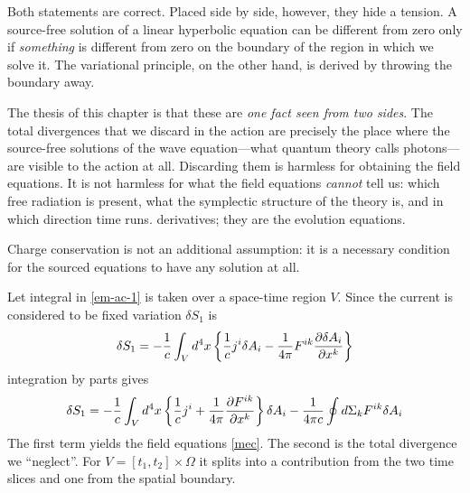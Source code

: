 Both statements are correct. Placed side by side, however, they hide a
tension. A source-free solution of a linear hyperbolic equation can be
different from zero only if \emph{something} is different from zero on the
boundary of the region in which we solve it. The variational principle, on
the other hand, is derived by throwing the boundary away.

The thesis of this chapter is that these are \emph{one fact seen from two
sides}. The total divergences that we discard in the action are precisely
the place where the source-free solutions of the wave equation---what
quantum theory calls photons---are visible to the action at all. Discarding
them is harmless for obtaining the field equations. It is not harmless for
what the field equations \emph{cannot} tell us: which free radiation is
present, what the symplectic structure of the theory is, and in which
direction time runs.
derivatives; they are the evolution equations.

Charge conservation is not an additional assumption: it is a necessary
condition for the sourced equations to have any solution at all.

Let integral in \eqref{em-ac-1} is taken over 
a space-time region $V$. Since the current is considered to be fixed
variation $ \delta S_1 $ is
\[
    \delta S_1=-\frac{1}{c}\int_V d^4x \left\{ \frac{1}{c} j^i \delta A_i
    -\frac{1}{4 \pi} F^{ik} \frac{\partial \delta A_i}{\partial x^k}\right\}
\]
integration by parts gives
\begin{equation}
    \label{em-ac-1-var}
\delta S_1=-\frac{1}{c}\int_V d^4x \left\{ \frac{1}{c} j^i 
 +\frac{1}{4 \pi}  \frac{\partial F^{ik}}{\partial x^k} \right\}\delta A_i
    -\frac{1}{4 \pi c} \oint d \Sigma_k F^{ik}\delta A_i
\end{equation}
The first term yields the field equations \eqref{mec}.
The second is the total divergence we ``neglect''. For
$V=[t_1,t_2]\times\Omega$ it splits into a contribution from the two time
slices and one from the spatial boundary.

